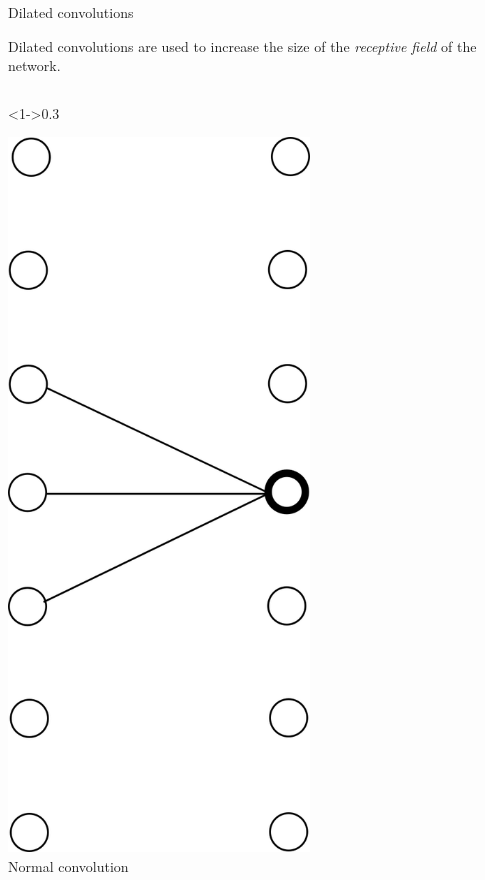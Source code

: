 \documentclass[xcolor=pdftex,dvipsnames,table,mathserif]{beamer}
\begin{document}
\begin{frame}{Dilated convolutions}

  Dilated convolutions are used to increase the size of the \emph{receptive field} of the network.

  \begin{columns}

    \begin{column}<1->{0.3\textwidth}
      \begin{center}
        \includegraphics[width=0.60\textwidth]{dil_conv1.png}
        \\ \scriptsize{Normal convolution}
      \end{center}
    \end{column}


\end{columns}
\end{frame}
\end{document}
